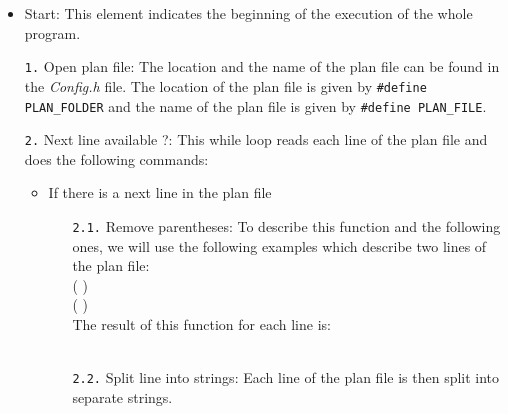 \begin{itemize}
\item Start: This element indicates the beginning of the execution of the whole program.
\item[\texttt{1.}] Open plan file: The location and the name of the plan file can be found in the \textit{Config.h} file. The location of the plan file is given by \texttt{\footnotesize{\#define PLAN\_FOLDER}} and the name of the plan file is given by \texttt{\footnotesize{\#define PLAN\_FILE}}.
\item[\texttt{2.}] Next line available ?: This while loop reads each line of the plan file and does the following commands:
\begin{itemize}
\item If there is a next line in the plan file
\begin{itemize}
\item[\texttt{2.1.}] Remove parentheses: To describe this function and the following ones, we will use the following examples which describe two lines of the plan file:\\
    \small{(  )} \\
    \small{(   )}\\
    The result of this function for each line is:\\
    \small{  } \\
    \small{   }
\item[\texttt{2.2.}] Split line into strings: Each line of the plan file is then split into separate strings.


\end{itemize}
\end{itemize}
\end{itemize}
